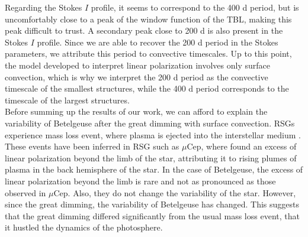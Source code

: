 \documentclass{aa}
\begin{document}
Regarding the Stokes $I$ profile, it seems to correspond to the 400 d period, but is uncomfortably close to a peak of the window function of the TBL, making this peak difficult to trust. A secondary peak close to 200 d is also present in the Stokes $I$ profile. Since we are able to recover the 200 d period in the Stokes parameters, we attribute this period to convective timescales. Up to this point, the model developed to interpret linear polarization involves only surface convection, which is why we interpret the 200 d period as the convective timescale of the smallest structures, while the 400 d period corresponds to the timescale of the largest structures.\\



Before summing up the results of our work, we can afford to explain the variability of Betelgeuse after the great dimming with surface convection. RSGs experience mass loss event, where plasma is ejected into the interstellar medium \citep{josselin_atmospheric_2007}. These events have been inferred in RSG such as $\mu$Cep, where \cite{lopez_ariste_height_2023} found an excess of linear polarization beyond the limb of the star, attributing it to rising plumes of plasma in the back hemisphere of the star. In the case of Betelgeuse, the excess of linear polarization beyond the limb is rare and not as pronounced as those observed in $\mu$Cep. Also, they do not change the variability of the star. However, since the great dimming, the variability of Betelgeuse has changed. This suggests that the great dimming differed significantly from the usual mass loss event, that it hustled the dynamics of the photosphere. \
\end{document}
